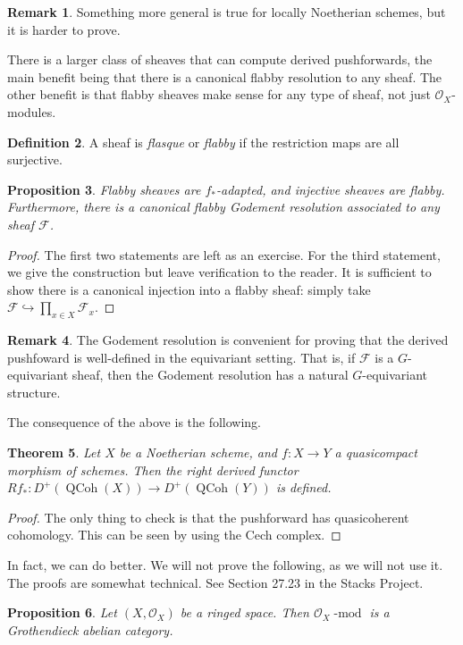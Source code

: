 \documentclass[10pt]{article}
\newtheorem{thm}{Theorem}[section]
\newtheorem{prop}[thm]{Proposition}
\theoremstyle{definition}
\newtheorem{defn}[thm]{Definition}
\newtheorem{rmk}[thm]{Remark}
\DeclareMathOperator{\dmod}{-mod}
\DeclareMathOperator{\QCoh}{QCoh}
\newcommand{\OO}{\mathcal{O}}
\begin{document}
\begin{rmk}
Something more general is true for locally Noetherian schemes, but it is harder to prove.
\end{rmk}

There is a larger class of sheaves that can compute derived pushforwards, the main benefit being that there is a canonical flabby resolution to any sheaf.  The other benefit is that flabby sheaves make sense for any type of sheaf, not just $\OO_X$-modules.
\begin{defn}
A sheaf is \emph{flasque} or \emph{flabby} if the restriction maps are all surjective.
\end{defn}

\begin{prop}
Flabby sheaves are $f_*$-adapted, and injective sheaves are flabby.  Furthermore, there is a canonical flabby  \emph{Godement resolution} associated to any sheaf $\mathcal{F}$.
\end{prop}
\begin{proof}
The first two statements are left as an exercise.  For the third statement, we give the construction but leave verification to the reader.  It is sufficient to show there is a canonical injection into a flabby sheaf: simply take $\mathcal{F} \hookrightarrow \prod_{x \in X} \mathcal{F}_x$.
\end{proof}

\begin{rmk}
The Godement resolution is convenient for proving that the derived pushfoward is well-defined in the equivariant setting.  That is, if $\mathcal{F}$ is a $G$-equivariant sheaf, then the Godement resolution has a natural $G$-equivariant structure.
\end{rmk}

The consequence of the above is the following.
\begin{thm}
Let $X$ be a Noetherian scheme, and $f: X \rightarrow Y$ a quasicompact morphism of schemes.  Then the right derived functor $Rf_*: D^+(\QCoh(X)) \rightarrow D^+(\QCoh(Y))$ is defined.
\end{thm}
\begin{proof}
The only thing to check is that the pushforward has quasicoherent cohomology.  This can be seen by using the Cech complex.
\end{proof}

In fact, we can do better.  We will not prove the following, as we will not use it.  The proofs are somewhat technical.  See Section 27.23 in the Stacks Project.
\begin{prop}
Let $(X, \OO_X)$ be a ringed space.  Then $\OO_X\dmod$ is a Grothendieck abelian category.
\end{prop}
\end{document}
